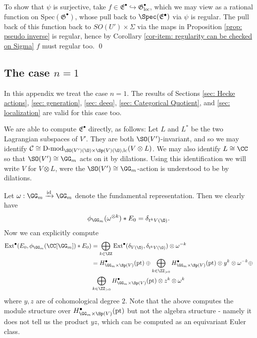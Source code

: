 \documentclass[11pt]{article}
\begin{document}
To show that $\psi$ is surjective, take $f\in \mathfrak{E}^\bullet\hookrightarrow \mathfrak{G}^\bullet_\mathrm{loc}$, which we may view as a rational function on $\mathrm{Spec}(\mathfrak{G}^\bullet)$, whose pull back to $\Spec(\mathfrak{E}^\bullet)$ via $\psi$ is regular. The pull back of this function back to $SO(U')\times \Sigma$ via the maps in Proposition \ref{prop: pseudo inverse} is regular, hence by Corollary \ref{cor-item: regularity can be checked on Sigma} $f$ must regular too.
\qed
\begin{appendices}
\section{The case $n=1$} \label{appendix: n=1}
In this appendix we treat the case $n=1$. The results of Sections \ref{sec: Hecke actions}, \ref{sec: generation}, \ref{sec: deeq}, \ref{sec: Categorical Quotient}, and \ref{sec: localization} are valid for this case too.


We are able to compute $\mathfrak{E}^{\bullet}$ directly, as follows:
Let $L$ and $L^*$ be the two Lagrangian subspaces of $V'$. They are both $\SO(V')$-invariant, and so we may identify
$\mathcal{C}\cong \operatorname{D-mod}_{\SO(V')(\O)\times \Sp(V)(\O),\mathrm{lc}}(V\otimes L)$. We may also identify $L\cong \CC$ so that $\SO(V')\cong \GG_m$ acts on it by dilations.
Using this identification we will write $V$ for $V\otimes L$, were the $\SO(V')\cong \GG_m$-action is understood to be by dilations.

Let $\omega:\GG_m\xrightarrow{\mathrm{id}}\GG_m$ denote the fundamental representation. Then we clearly have $$\phi_{\GG_m}(\omega^{\otimes k}) * E_0 = \delta_{t^kV(\O)}.$$
Now we can explicitly compute
\begin{equation}\label{eq:n=1 computation}
    \begin{aligned}
        \mathrm{Ext}^\bullet(E_0, \phi_{\GG_m}(\CC[\GG_m]) * E_0) &= \bigoplus_{k\in \ZZ} \mathrm{Ext}^\bullet(\delta_{V(\O)}, \delta_{t^kV(\O)}) \otimes \omega^{-k} \\&= H^\bullet_{\GG_m\times \Sp(V)}(\mathrm{pt})\oplus \bigoplus_{k\in \ZZ_{>0}} H^\bullet_{\GG_m\times \Sp(V)}(\mathrm{pt})\otimes y^k \otimes \omega^{-k} \oplus\\& \bigoplus_{k\in \ZZ_{>0}} H^\bullet_{\GG_m\times \Sp(V)}(\mathrm{pt})\otimes z^k \otimes \omega^{k}
    \end{aligned}
\end{equation}
where $y, z$ are of cohomological degree $2$. Note that the above computes the module structure over $H^\bullet_{\GG_m\times \Sp(V)}(\mathrm{pt})$ but not the algebra structure - namely it does not tell us the product $yz$, which can be computed as an equivariant Euler class.


\end{appendices}
\end{document}
